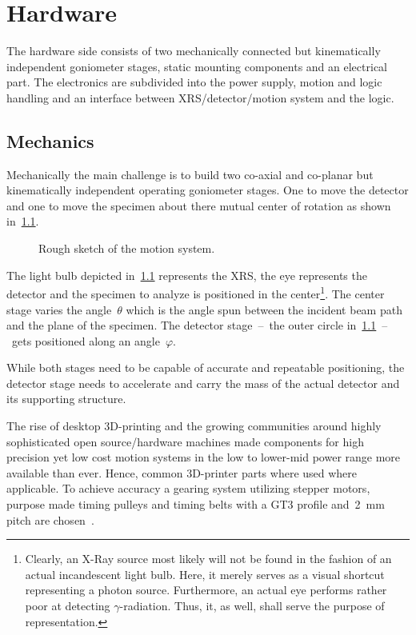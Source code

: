 \chapter{Hardware}\label{chap:hardware}
    The hardware side consists of two mechanically connected but kinematically independent goniometer stages, static mounting components and an electrical part.
    The electronics are subdivided into the power supply, motion and logic handling and an interface between XRS/detector/motion system and the logic.

    \section{Mechanics}\label{sec:mechanics}
        Mechanically the main challenge is to build two co-axial and co-planar but kinematically independent operating goniometer stages.
        One to move the detector and one to move the specimen about there mutual center of rotation as shown in~\cref{fig:rough sketch of the motion system}.
        \begin{figure}[!h]
            \centering
            \caption[Rough sketch of the motion system]{Rough sketch of the motion system.}%
            \label{fig:rough sketch of the motion system}%
        \end{figure}
        The light bulb depicted in~\cref{fig:rough sketch of the motion system} represents the XRS, the eye represents the detector and the specimen to analyze is positioned in the center\footnote{Clearly, an X-Ray source most likely will not be found in the fashion of an actual incandescent light bulb. Here, it merely serves as a visual shortcut representing a photon source. Furthermore, an actual eye performs rather poor at detecting \(\gamma\)-radiation. Thus, it, as well, shall serve the purpose of representation.}.
        The center stage varies the angle~\(\theta\) which is the angle spun between the incident beam path and the plane of the specimen.
        The detector stage~--~the outer circle in~\cref{fig:rough sketch of the motion system}~--~gets positioned along an angle~\(\varphi\).\par\medskip

        While both stages need to be capable of accurate and repeatable positioning, the detector stage needs to accelerate and carry the mass of the actual detector and its supporting structure.

        The rise of desktop 3D-printing and the growing communities around highly sophisticated open source/hardware machines made components for high precision yet low cost motion systems in the low to lower-mid power range more available than ever.
        Hence, common 3D-printer parts where used where applicable.
        To achieve accuracy a gearing system utilizing stepper motors, purpose made timing pulleys and timing belts with a GT3 profile and~\qty{2}{\milli\metre} pitch are chosen~\cite{Manual.POWERGRIPGT3,Manual.LIGHTPOWERPRECISION}.
        
